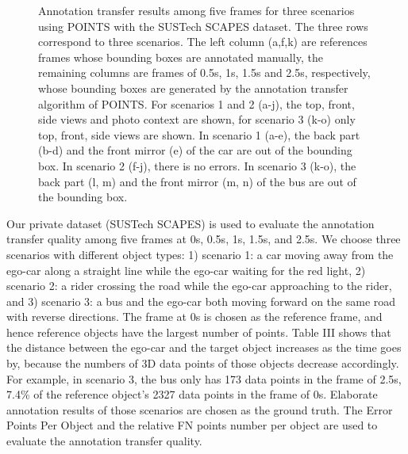 \documentclass[letterpaper, 10 pt, conference]{ieeeconf}  %
\begin{document}
\begin{figure}[th]
\begin{subfigure}{0.16\linewidth}
		\caption{}
	\end{subfigure}
	\caption{Annotation transfer results among five frames for three scenarios using POINTS with the SUSTech SCAPES dataset. The three rows correspond to three scenarios. The left column (a,f,k) are references frames whose bounding boxes are annotated manually, the remaining columns are frames of 0.5s, 1s, 1.5s and 2.5s, respectively, whose bounding boxes are generated by the annotation transfer algorithm of POINTS. For scenarios 1 and 2 (a-j), the top, front, side views and photo context are shown, for scenario 3 (k-o) only top, front, side views are shown. In scenario 1 (a-e), the back part (b-d) and the front mirror (e) of the car are out of the bounding box. In scenario 2 (f-j), there is no errors. In scenario 3 (k-o), the back part (l, m) and the front mirror (m, n) of the bus are out of the bounding box.}
	\label{fig:anno-transfer}
\end{figure}


Our private dataset (SUSTech SCAPES) is used to evaluate the annotation transfer quality among five frames at 0s, 0.5s, 1s, 1.5s, and 2.5s.  
We choose three scenarios with different object types: 
1) scenario 1: a car moving away from the ego-car along a straight line while the ego-car waiting for the red light, 
2) scenario 2: a rider crossing the road while the ego-car approaching to the rider, and 
3) scenario 3: a bus and the ego-car both moving forward on the same road with reverse directions. 
The frame at 0s is chosen as the reference frame, and hence reference objects have the largest number of points. 
Table III shows that the distance between the ego-car and the target object increases as the time goes by, 
because the numbers of 3D data points of those objects decrease accordingly. 
For example, in scenario 3, the bus only has 173 data points in the frame of 2.5s, 7.4\% of the reference object's 2327 data points in the frame of 0s.
Elaborate annotation results of those scenarios are chosen as the ground truth.
The Error Points Per Object and the relative FN points number per object are used to evaluate the annotation transfer quality.
\end{document}
